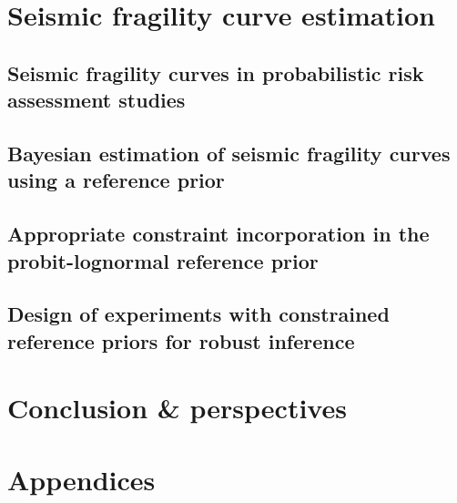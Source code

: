 \documentclass[a4paper]{book}
\begin{document}



\part{Seismic fragility curve estimation}\label{part:spra}


\chapter{Seismic fragility curves in probabilistic risk assessment studies}\label{chap:frags-intro}




\chapter{Bayesian estimation of seismic fragility curves using a reference prior}\label{chap:prem}




\chapter{Appropriate constraint incorporation in the probit-lognormal reference prior%
}\label{chap:constrained-frags}




\chapter{Design of experiments with constrained reference priors for robust inference%
}\label{chap:doe}






\part{Conclusion \& perspectives}\label{part:conclusion}




\appendix
\part*{Appendices}\label{part:appendix}
\end{document}
